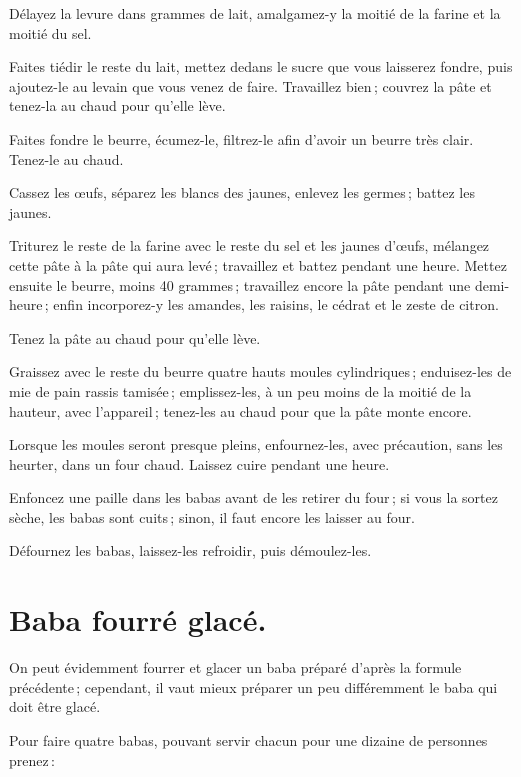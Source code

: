 Délayez la levure dans {\mmm} grammes de lait, amalgamez-y la moitié de
la farine et la moitié du sel.

Faites tiédir le reste du lait, mettez dedans le sucre que vous laisserez
fondre, puis ajoutez-le au levain que vous venez de faire. Travaillez bien ;
couvrez la pâte et tenez-la au chaud pour qu'elle lève.

Faites fondre le beurre, écumez-le, filtrez-le afin d'avoir un beurre très clair.
Tenez-le au chaud.

Cassez les œufs, séparez les blancs des jaunes, enlevez les germes ; battez les
jaunes.

Triturez le reste de la farine avec le reste du sel et les jaunes d'œufs,
mélangez cette pâte à la pâte qui aura levé ; travaillez et battez pendant une
heure. Mettez ensuite le beurre, moins 40 grammes ; travaillez encore la pâte
pendant une demi-heure ; enfin incorporez-y les amandes, les raisins, le cédrat
et le zeste de citron.

Tenez la pâte au chaud pour qu'elle lève.

Graissez avec le reste du beurre quatre hauts moules cylindriques ;
enduisez-les de mie de pain rassis tamisée ; emplissez-les, à un peu moins de
la moitié de la hauteur, avec l'appareil ; tenez-les au chaud pour que la pâte
monte encore.

Lorsque les moules seront presque pleins, enfournez-les, avec précaution, sans
les heurter, dans un four chaud. Laissez cuire pendant une heure.

Enfoncez une paille dans les babas avant de les retirer du four ; si vous la
sortez sèche, les babas sont cuits ; sinon, il faut encore les laisser au four.

Défournez les babas, laissez-les refroidir, puis démoulez-les.

\section*{\centering Baba fourré glacé.}
{}

On peut évidemment fourrer et glacer un baba préparé d'après la formule
précédente ; cependant, il vaut mieux préparer un peu différemment le baba qui
doit être glacé.

Pour faire quatre babas, pouvant servir chacun pour une dizaine de personnes
prenez :

\medskip

